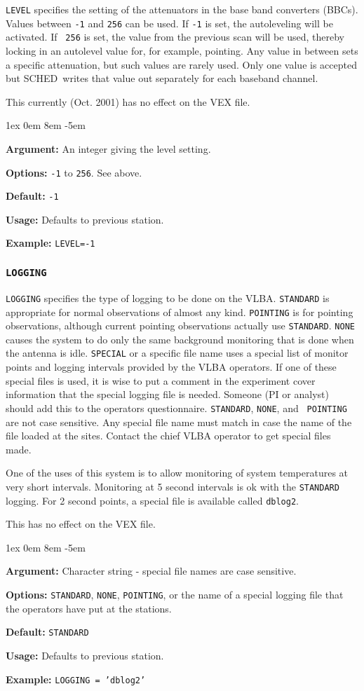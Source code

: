 \documentclass{report}
\newcommand{\schedb}{{\sc SCHED~}}
\newcommand{\rcwbox}[5]{
  \begin{list}{}{\parsep 1ex  \itemsep 0em
                 \leftmargin 8em  \itemindent -5em }
    \item {\bf Argument:} #1
    \item {\bf Options:}  #2
    \item {\bf Default:}  #3
    \item {\bf Usage:}    #4
    \item {\bf Example:}  #5
  \end{list}
}
\begin{document}
{\tt LEVEL} specifies the setting of the attenuators in the base band
converters (BBCs). Values between {\tt -1} and {\tt 256} can be
used. If {\tt -1} is set, the autoleveling will be activated. If {\tt
256} is set, the value from the previous scan will be used, thereby
locking in an autolevel value for, for example, pointing. Any value in
between sets a specific attenuation, but such values are rarely
used. Only one value is accepted but \schedb writes that value out
separately for each baseband channel.

This currently (Oct. 2001) has no effect on the VEX file.


\rcwbox
{An integer giving the level setting.}
{{\tt -1} to {\tt 256}. See above.}
{{\tt -1}}
{Defaults to previous station.}
{{\tt LEVEL=-1}}


\subsubsection{\label{SP:LOGGING}{\tt LOGGING}}

{\tt LOGGING} specifies the type of logging to be done on the
VLBA. {\tt STANDARD} is appropriate for normal observations of almost
any kind.  {\tt POINTING} is for pointing observations, although
current pointing observations actually use {\tt STANDARD}.  {\tt NONE}
causes the system to do only the same background monitoring that is
done when the antenna is idle.  {\tt SPECIAL} or a specific file name
uses a special list of monitor points and logging intervals provided
by the VLBA operators.  If one of these special files is used, it is
wise to put a comment in the experiment cover information that the
special logging file is needed.  Someone (PI or analyst) should add
this to the operators questionnaire. {\tt STANDARD}, {\tt NONE}, and {\tt
POINTING} are not case sensitive.  Any special file name must match
in case the name of the file loaded at the sites.  Contact the chief
VLBA operator to get special files made.

One of the uses of this system is to allow monitoring of system
temperatures at very short intervals.  Monitoring at 5 second intervals
is ok with the {\tt STANDARD} logging.  For 2 second points, a special
file is available called {\tt dblog2}.

This has no effect on the VEX file.

\rcwbox
{Character string - special file names are case sensitive.}
{{\tt STANDARD}, {\tt NONE}, {\tt POINTING}, or the name of a special
logging file that the operators have put at the stations.}
{{\tt STANDARD}}
{Defaults to previous station.}
{{\tt LOGGING = 'dblog2'}}
\end{document}
